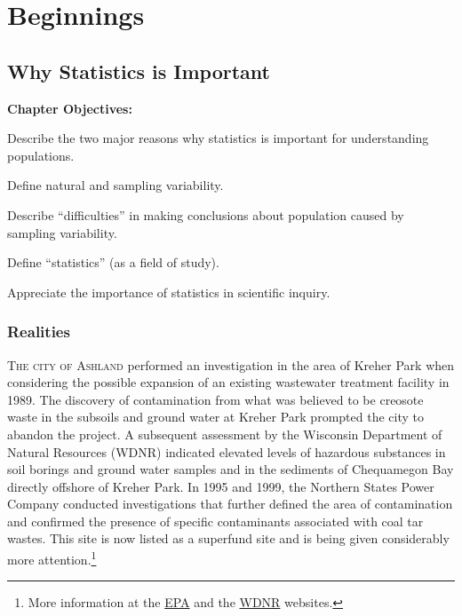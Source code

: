 \documentclass[10pt,openany]{book}\usepackage[]{graphicx}\usepackage[]{color}
\begin{document}
  \frontmatter
    

  \mainmatter
    \part{Beginnings}



\chapter{Why Statistics is Important} \label{chap:WhyStatsImportant}
\begin{ChapObj}{\boxwidth}
  \textbf{Chapter Objectives:}
  \begin{Enumerate}
    \item Describe the two major reasons why statistics is important for understanding populations.
    \item Define natural and sampling variability.
    \item Describe ``difficulties'' in making conclusions about population caused by sampling variability.
    \item Define ``statistics'' (as a field of study).
    \item Appreciate the importance of statistics in scientific inquiry.
  \end{Enumerate}
\end{ChapObj}

\minitoc
\newpage

\section{Realities}\label{sect:Realities}
\lettrine{T}{he city of Ashland} performed an investigation in the area of Kreher Park  when considering the possible expansion of an existing wastewater treatment facility in 1989.  The discovery of contamination from what was believed to be creosote waste in the subsoils and ground water at Kreher Park prompted the city to abandon the project. A subsequent assessment by the Wisconsin Department of Natural Resources (WDNR) indicated elevated levels of hazardous substances in soil borings and ground water samples and in the sediments of Chequamegon Bay directly offshore of Kreher Park.  In 1995 and 1999, the Northern States Power Company conducted investigations that further defined the area of contamination and confirmed the presence of specific contaminants associated with coal tar wastes.  This site is now listed as a superfund site and is being given considerably more attention.\footnote{More information at the \href{https://cumulis.epa.gov/supercpad/cursites/csitinfo.cfm?id=0507952}{EPA} and the \href{http://dnr.wi.gov/topic/brownfields/ashland.html}{WDNR} websites.}
\end{document}
